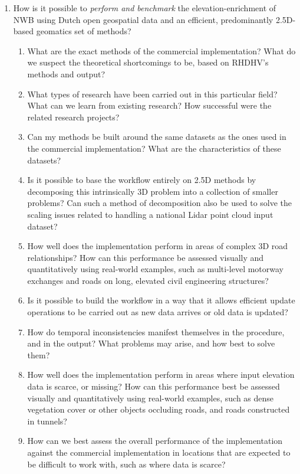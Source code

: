 \begin{enumerate}
    \item How is it possible to \textit{perform and benchmark} the elevation-enrichment of NWB using Dutch open geospatial data and an efficient, predominantly 2.5D-based geomatics set of methods?
    \begin{enumerate}
        \item What are the exact methods of the commercial implementation? What do we suspect the theoretical shortcomings to be, based on RHDHV's methods and output?
        \item What types of research have been carried out in this particular field? What can we learn from existing research? How successful were the related research projects?
        \item Can my methods be built around the same datasets as the ones used in the commercial implementation? What are the characteristics of these datasets?
        \item Is it possible to base the workflow entirely on 2.5D methods by decomposing this intrinsically 3D problem into a collection of smaller problems? Can such a method of decomposition also be used to solve the scaling issues related to handling a national Lidar point cloud input dataset?
        \item How well does the implementation perform in areas of complex 3D road relationships? How can this performance be assessed visually and quantitatively using real-world examples, such as multi-level motorway exchanges and roads on long, elevated civil engineering structures?
        \item Is it possible to build the workflow in a way that it allows efficient update operations to be carried out as new data arrives or old data is updated?
        \item How do temporal inconsistencies manifest themselves in the procedure, and in the output? What problems may arise, and how best to solve them?
        \item How well does the implementation perform in areas where input elevation data is scarce, or missing? How can this performance best be assessed visually and quantitatively using real-world examples, such as dense vegetation cover or other objects occluding roads, and roads constructed in tunnels?
        \item How can we best assess the overall performance of the implementation against the commercial implementation in locations that are expected to be difficult to work with, such as where data is scarce?

\end{enumerate}
\end{enumerate}
